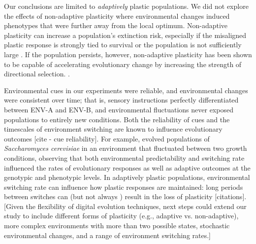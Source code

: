 Our conclusions are limited to \textit{adaptively} plastic populations.
We did not explore the effects of non-adaptive plasticity where environmental changes induced phenotypes that were further away from the local optimum.
Non-adaptive plasticity can increase a population's extinction risk, especially if the misaligned plastic response is strongly tied to survival or the population is not sufficiently large \citep{gomulkiewicz_when_1995,chevin_adaptation_2010}.
If the population persists, however, non-adaptive plasticity has been shown to be capable of accelerating evolutionary change by increasing the strength of directional selection. \citep{ghalambor_non-adaptive_2015}.

Environmental cues in our experiments were reliable, and environmental changes were consistent over time; that is, sensory instructions perfectly differentiated between ENV-A and ENV-B, and environmental fluctuations never exposed populations to entirely new conditions.
Both the reliability of cues and the timescales of environment switching are known to influence evolutionary outcomes \citep{li_digital_2004,boyer_adaptation_2021} [cite - cue reliability].
For example, \cite{boyer_adaptation_2021} evolved populations of \textit{Saccharomyces cerevisiae} in an environment that fluctuated between two growth conditions, observing that both environmental predictability and switching rate influenced the rates of evolutionary responses as well as adaptive outcomes at the genotypic and phenotypic levels. %
In adaptively plastic populations, environmental switching rate can influence how plastic responses are maintained: long periods between switches can (but not always \citep{grant_maintenance_2020}) result in the loss of plasticity [citations].
[Given the flexibility of digital evolution techniques, next steps could extend our study to include different forms of plasticity (e.g., adaptive vs. non-adaptive), more complex environments with more than two possible states, stochastic environmental changes, and a range of environment switching rates.]

